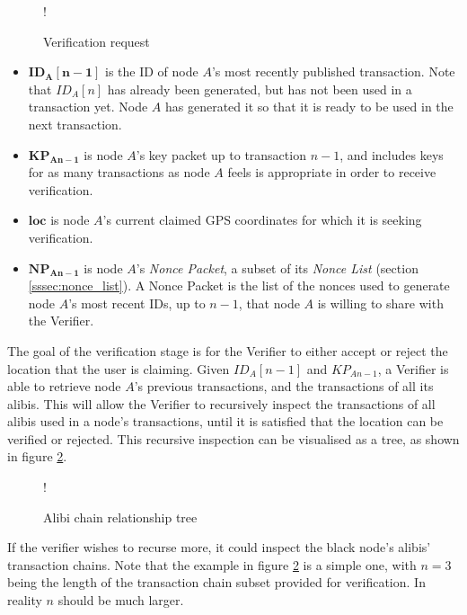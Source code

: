 \begin{figure}[H]
\begin{center}
 {!} {}
\caption{Verification request}
\label{fig:verify_request}
\end{center}
\end{figure}

\begin{itemize}[noitemsep,topsep=0pt]
	\item[] $\mathbf{ID_{A}[n-1]}$ is the ID of node $A$'s most recently published transaction. Note that $ID_A[n]$ has already been generated, but has not been used in a transaction yet. Node $A$ has generated it so that it is ready to be used in the next transaction.
	\item[] $\mathbf{KP_{An-1}}$ is node $A$'s key packet up to transaction $n-1$, and includes keys for as many transactions as node $A$ feels is appropriate in order to receive verification.
	\item[] $\mathbf{loc}$ is node $A$'s current claimed GPS coordinates for which it is seeking verification.
	\item[] $\mathbf{NP_{An-1}}$ is node $A$'s \textit{Nonce Packet}, a subset of its \textit{Nonce List} (section \ref{sssec:nonce_list}). A Nonce Packet is the list of the nonces used to generate node $A$'s most recent IDs, up to $n-1$, that node $A$ is willing to share with the Verifier. 
\end{itemize}

\null
The goal of the verification stage is for the Verifier to either accept or reject the location that the user is claiming. Given $ID_{A}[n-1]$ and $KP_{An-1}$, a Verifier is able to retrieve node $A$'s previous transactions, and the transactions of all its alibis. This will allow the Verifier to recursively inspect the transactions of all alibis used in a node's transactions, until it is satisfied that the location can be verified or rejected. This recursive inspection can be visualised as a tree, as shown in figure \ref{fig:tree}.

\begin{figure}[H]
\begin{center}
 {!} {}
\vspace{-3cm}
\caption{Alibi chain relationship tree}
\label{fig:tree}
\end{center}
\end{figure}

If the verifier wishes to recurse more, it could inspect the black node's alibis' transaction chains. Note that the example in figure \ref{fig:tree} is a simple one, with $n = 3$ being the length of the transaction chain subset provided for verification. In reality $n$ should be much larger.

